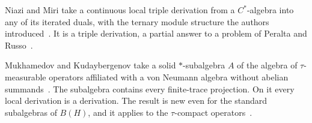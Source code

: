 Niazi and Miri take a continuous local triple derivation from a
$C^*$-algebra into any of its iterated duals, with the ternary module
structure the authors introduced~\cite{WlLocalTripleDerivationsFromCSta2018}. It is a triple derivation, a partial answer to
a problem of Peralta and Russo~\cite{WlLocalTripleDerivationsFromCSta2018}.

Mukhamedov and Kudaybergenov take a solid $*$-subalgebra $A$ of the
algebra of $\tau$-measurable operators affiliated with a von Neumann algebra
without abelian summands~\cite{WlLocalDerivationsOnSubalgebrasO2015}. The subalgebra contains every finite-trace
projection. On it every local derivation is a derivation. The result is new
even for the
standard subalgebras of $B(H)$, and it applies to the $\tau$-compact
operators~\cite{WlLocalDerivationsOnSubalgebrasO2015}.
